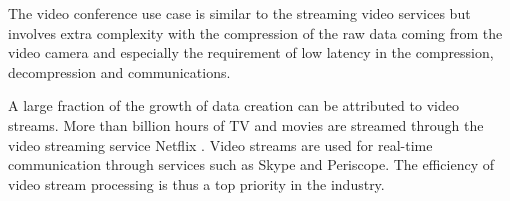 The video conference use case is similar to the streaming video services but involves extra complexity with the compression of the raw data coming from the video camera and especially the requirement of low latency in the compression, decompression and communications.

A large fraction of the growth of data creation can be attributed to video streams. More than billion hours of TV and movies are streamed through the video streaming service Netflix \cite{turner2014digital}. Video streams are used for real-time communication through services such as Skype and Periscope. The efficiency of video stream processing is thus a top priority in the industry.

